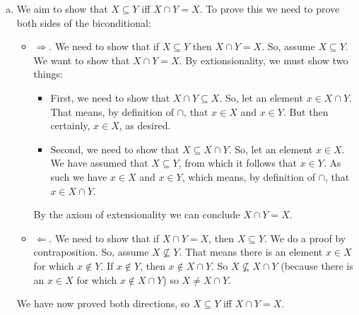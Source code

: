 \begin{itemize}
\begin{enumerate}[(a)]
          \item  We aim to show that $X \subseteq Y$ iff $X \cap Y = X$. To prove this we need to prove both sides of the biconditional:
            \begin{itemize}
              \item $\Rightarrow$. We need to show that if $X \subseteq Y$ then  $X \cap Y = X$. So, assume $X \subseteq Y$.
                We want to show that $X \cap Y = X$.
                By extionsionality, we must show two things:
                \begin{itemize}
                  \item First, we need to show that $X \cap Y \subseteq X$.
                    So, let an element $x \in X \cap Y$.
                    That means, by definition of $\cap$, that $x \in X$ and $x \in Y$.
                    But then certainly, $x \in X$, as desired.
                  \item Second, we need to show that $X \subseteq X \cap Y$.
                    So, let an element $x \in X$.
                    We have assumed that $X \subseteq Y$,
                    from which it follows that $x \in Y$.
                    As such we have $x \in X$ and $x \in Y$, which means, by definition of $\cap$, that $x \in X \cap Y$.
                \end{itemize}

                By the axiom of extensionality we can conclude $X \cap Y = X$.

              \item $\Leftarrow$. We need to show that if $X \cap Y = X$, then $X \subseteq Y$.
                We do a proof by contraposition.
                So, assume $X \not \subseteq Y$.
                That means there is an element $x \in X$ for which $x \not \in Y$.
                If $x \not \in Y$, then $x \not \in X \cap Y$.
                So $X \not \subseteq X \cap Y$ (because there is an $x \in X$ for which $x \not \in X \cap Y$) so $X \not = X \cap Y$.

            \end{itemize}

We have now proved both directions, so $X \subseteq Y$ iff $X \cap Y = X$.


\end{enumerate}
\end{itemize}
